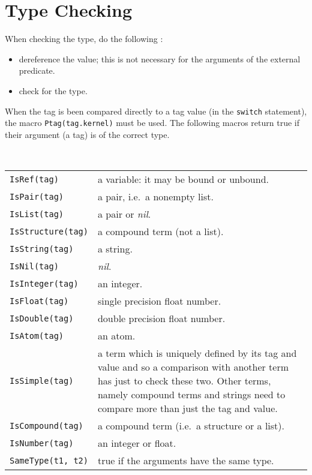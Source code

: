 \section{Type Checking}
When checking the type, do the following :
\begin{itemize}
\item dereference the value; this is not necessary for the arguments
of the external predicate. 


\item check for the type. 
\end{itemize}
When the tag is been compared directly to a tag value (in the 
{\tt switch} statement), the macro {\tt Ptag(tag.kernel)} must be used.
The following macros return true if their argument (a tag) is of the correct 
type.

\noindent
 \\
\begin{tabular}{|p{5cm}p{10cm}|} 
\hline
{\tt IsRef(tag)} &	a variable: it may be bound or unbound. \\

{\tt IsPair(tag)} & 	a pair, i.e.\ a nonempty list. \\

{\tt IsList(tag)} & 	a pair or {\it nil}. \\

{\tt IsStructure(tag)} & a compound term (not a list). \\ 

{\tt IsString(tag)} & a string. \\

{\tt IsNil(tag)} &	{\it nil}. \\

{\tt IsInteger(tag)} & an integer. \\

{\tt IsFloat(tag)} &	single precision float number. \\

{\tt IsDouble(tag)} &	double precision float number. \\

{\tt IsAtom(tag)} & an atom. \\

{\tt IsSimple(tag)} &	
a term which is uniquely defined by its tag and value and so a comparison with
another term has just to check these two. Other terms, namely compound
terms and strings need to compare more than just the tag and value.\\

{\tt IsCompound(tag)} & a compound term (i.e.\ a structure or a list). \\

{\tt IsNumber(tag)} &	an integer or float. \\

{\tt SameType(t1, t2)} & true if the arguments have the same type. \\
\hline
\end{tabular}

